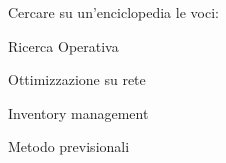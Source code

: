 \documentclass{beamer}
\begin{document}
\generatitolo

\begin{frame}{\approfondimenti}
Cercare su un'enciclopedia le voci:

    \begin{description}
     \item Ricerca Operativa
     \item Ottimizzazione su rete
     \item Inventory management
     \item Metodo previsionali
    \end{description}
\end{frame}
\end{document}
